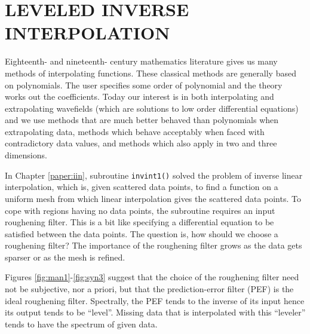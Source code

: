 \section{LEVELED INVERSE INTERPOLATION}
Eighteenth- and nineteenth- century mathematics literature gives us
many methods of interpolating functions.
These classical methods are generally based on polynomials.
The user specifies some order of polynomial
and the theory works out the coefficients.
Today our interest is in both interpolating and extrapolating wavefields
(which are solutions to low order differential equations)
and we use methods that
are much better behaved than polynomials when extrapolating data,
methods which behave acceptably when faced with contradictory data values,
and methods which also apply in two and three dimensions.
\par
In Chapter \ref{paper:iin},
subroutine \texttt{invint1()} 
solved the problem of inverse linear interpolation,
which is,
given scattered data points,
to find a function on a uniform mesh
from which linear interpolation gives the scattered data points.
To cope with regions having no data points,
the subroutine requires an input roughening filter.
This is a bit like specifying a differential equation
to be satisfied between the data points.
The question is, how should we choose a roughening filter?
The importance of the roughening filter
grows as the data gets sparser or as the mesh is refined.
\par
Figures \ref{fig:man1}-\ref{fig:syn3} suggest that the choice
of the roughening filter need not be subjective,
nor a priori,
but that the prediction-error filter (PEF) is the ideal roughening filter.
Spectrally, the PEF tends to the inverse of its input
hence its output tends to be ``level''.
Missing data that is interpolated with this ``leveler''
tends to have the spectrum of given data.
%
%
